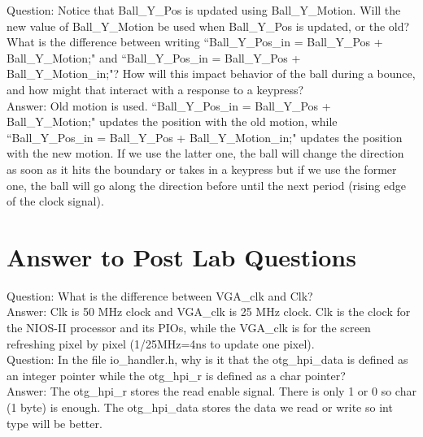\documentclass[12pt]{article}
\begin{document}
Question: Notice that Ball\_Y\_Pos is updated using Ball\_Y\_Motion. Will the new value of Ball\_Y\_Motion be used when Ball\_Y\_Pos is updated, or the old? What is the difference between writing ``Ball\_Y\_Pos\_in = Ball\_Y\_Pos + Ball\_Y\_Motion;" and ``Ball\_Y\_Pos\_in = Ball\_Y\_Pos + Ball\_Y\_Motion\_in;"? How will this impact behavior of the ball during a bounce, and how might that interact with a response to a keypress? \\

Answer: Old motion is used. ``Ball\_Y\_Pos\_in = Ball\_Y\_Pos + Ball\_Y\_Motion;" updates the position with the old motion, while ``Ball\_Y\_Pos\_in = Ball\_Y\_Pos + Ball\_Y\_Motion\_in;" updates the position with the new motion. If we use the latter one, the ball will change the direction as soon as it hits the boundary or takes in a keypress but if we use the former one, the ball will go along the direction before until the next period (rising edge of the clock signal). \\

\section{Answer to Post Lab Questions}
Question: What is the difference between VGA\_clk and Clk? \\

Answer: Clk is 50 MHz clock and VGA\_clk is 25 MHz clock. Clk is the clock for the NIOS-II processor and its PIOs, while the VGA\_clk is for the screen refreshing pixel by pixel (1/25MHz=4ns to update one pixel). \\

Question: In the file io\_handler.h, why is it that the otg\_hpi\_data is defined as an integer
pointer while the otg\_hpi\_r is defined as a char pointer? \\

Answer: The otg\_hpi\_r stores the read enable signal. There is only 1 or 0 so char (1 byte) is enough. The otg\_hpi\_data stores the data we read or write so int type will be better. \\

\begin{table}[H]
    \centering
    \caption{Design statistics table for the multiplier.}
\end{table}
\end{document}
